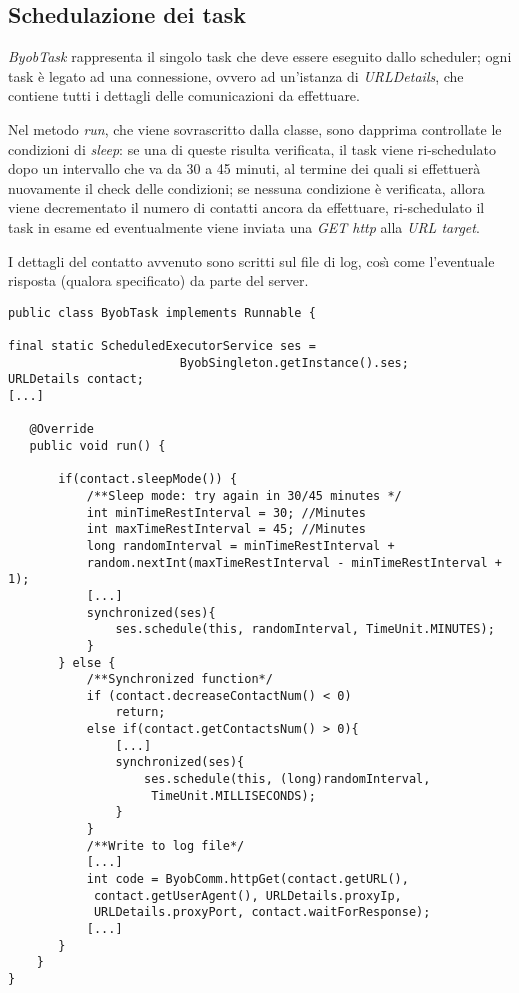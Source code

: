 \subsection{Schedulazione dei task}
\textit{ByobTask} rappresenta il singolo task che deve essere eseguito dallo scheduler; ogni task \`{e} legato ad una connessione, ovvero ad un'istanza di \textit{URLDetails}, che contiene tutti i dettagli delle comunicazioni da effettuare.

Nel metodo \textit{run}, che viene sovrascritto dalla classe, sono dapprima controllate le condizioni di \textit{sleep}: 
se una di queste risulta verificata, il task viene ri-schedulato dopo un intervallo che va da 30 a 45 minuti, al termine dei quali si effettuer\`{a} nuovamente il check delle condizioni;
se nessuna condizione \`{e} verificata, allora viene decrementato il numero di contatti ancora da effettuare, ri-schedulato il task in esame ed eventualmente viene inviata una \textit{GET http} alla \textit{URL target}.

I dettagli del contatto avvenuto sono scritti sul file di log, cos\`{\i} come l'eventuale risposta (qualora specificato) da parte del server.
\newpage
\vspace{0.5cm}
\begin{lstlisting}
public class ByobTask implements Runnable {

final static ScheduledExecutorService ses = 
						ByobSingleton.getInstance().ses;
URLDetails contact;
[...]

   @Override
   public void run() {
   
	   if(contact.sleepMode()) {
		   /**Sleep mode: try again in 30/45 minutes */
		   int minTimeRestInterval = 30; //Minutes
		   int maxTimeRestInterval = 45; //Minutes
		   long randomInterval = minTimeRestInterval + 
		   random.nextInt(maxTimeRestInterval - minTimeRestInterval + 1);
		   [...]
		   synchronized(ses){
			   ses.schedule(this, randomInterval, TimeUnit.MINUTES);
		   }
	   } else {        
		   /**Synchronized function*/
		   if (contact.decreaseContactNum() < 0) 
			   return; 
		   else if(contact.getContactsNum() > 0){
			   [...]
			   synchronized(ses){
				   ses.schedule(this, (long)randomInterval,
				    TimeUnit.MILLISECONDS);
			   }
		   }
		   /**Write to log file*/
		   [...]
		   int code = ByobComm.httpGet(contact.getURL(),
		    contact.getUserAgent(), URLDetails.proxyIp, 
		    URLDetails.proxyPort, contact.waitForResponse);
	       [...]
	   }
	}
}
\end{lstlisting}


